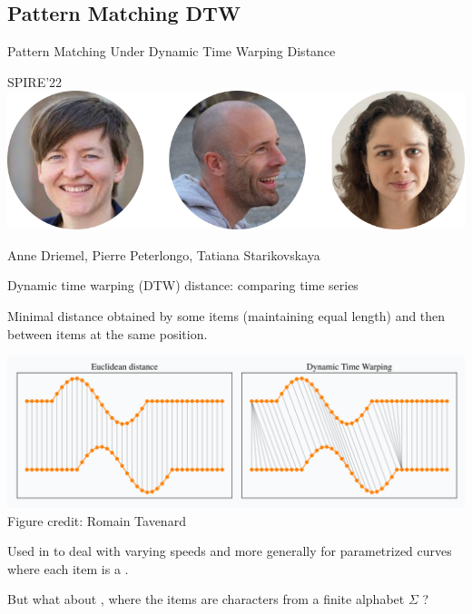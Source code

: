\subsection{Pattern Matching DTW}

\newcommand{\dtw}{\mathrm{DTW}}
\newcommand{\ed}{\mathrm{ED}}
\newcommand{\RLE}{\mathrm{RLE}}


\begin{frame}
    \centering
    {\Large Pattern Matching Under Dynamic Time Warping Distance}
  
    \bigskip
    {\large SPIRE'22}\\
    \bigskip
    \includegraphics{pictures/mindmap/dtw.png}
  
    \bigskip
    Anne Driemel, Pierre Peterlongo, Tatiana Starikovskaya
\end{frame}


\begin{frame}{Dynamic time warping (DTW) distance: comparing time series}

 Minimal distance obtained by  some items (maintaining equal length) and then  between items at the same position.

\begin{center}
\includegraphics[scale=0.3]{figures/dtw_vs_euc.png}\\
\tiny{Figure credit: Romain Tavenard}
\end{center}
\pause
\small
Used in  to deal with varying speeds and more generally for parametrized curves where each item is a .\pause

\vfill
But what about , where the items are characters from a finite alphabet $\Sigma$ ?
\end{frame}


